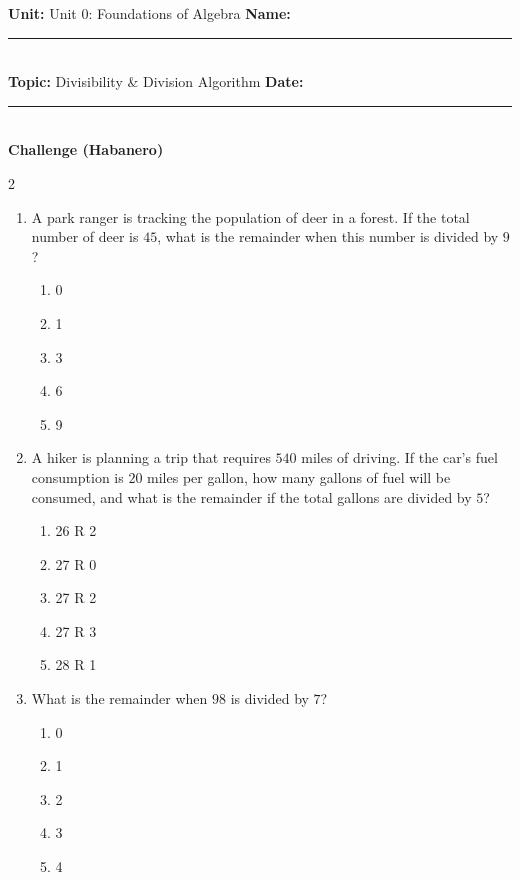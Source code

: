 \documentclass[10pt]{article}
\begin{document}
\enlargethispage{2.5cm}

\begin{tcolorbox}[colback=mainblue!5, colframe=mainblue, sharp corners, boxrule=0.5pt]
    \small \textbf{Unit:} Unit 0: Foundations of Algebra \hfill \textbf{Name:} \rule{3cm}{0.4pt} \\
    \small \textbf{Topic:} Divisibility & Division Algorithm \hfill \textbf{Date:} \rule{2cm}{0.4pt} \\
    \centering \textbf{\large Challenge (Habanero)}
\end{tcolorbox}

\vspace{0.2cm}

\begin{multicols}{2}
\begin{enumerate}[label=\textbf{Q\arabic*.}, leftmargin=*, itemsep=6pt, parsep=0pt]

  \item \small A park ranger is tracking the population of deer in a forest. If the total number of deer is $45$, what is the remainder when this number is divided by $9$?
  \begin{enumerate}[label=(\Alph*), leftmargin=0.6cm, nosep, itemsep=2pt]
    \item 0
    \item 1
    \item 3
    \item 6
    \item 9
  \end{enumerate}

  \item \small A hiker is planning a trip that requires $540$ miles of driving. If the car's fuel consumption is $20$ miles per gallon, how many gallons of fuel will be consumed, and what is the remainder if the total gallons are divided by $5$?
  \begin{enumerate}[label=(\Alph*), leftmargin=0.6cm, nosep, itemsep=2pt]
    \item 26 R 2
    \item 27 R 0
    \item 27 R 2
    \item 27 R 3
    \item 28 R 1
  \end{enumerate}

  \item \small What is the remainder when $98$ is divided by $7$?
  \begin{enumerate}[label=(\Alph*), leftmargin=0.6cm, nosep, itemsep=2pt]
    \item 0
    \item 1
    \item 2
    \item 3
    \item 4
  \end{enumerate}


\end{enumerate}
\end{multicols}
\end{document}
